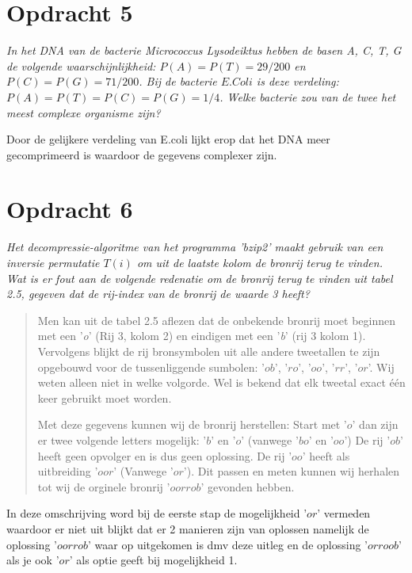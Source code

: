 \section{Opdracht 5}
\emph{In het DNA van de bacterie \emph{Micrococcus Lysodeiktus} hebben de basen \emph{A, C, T, G} de volgende waarschijnlijkheid: $P(A)=P(T)=29/200$ en $P(C)=P(G)=71/200$. Bij de bacterie $E. Coli$ is deze verdeling: $P(A)=P(T)=P(C)=P(G)=1/4$. Welke bacterie zou van de twee het meest complexe organisme zijn?}

Door de gelĳkere verdeling van E.coli lĳkt erop dat het DNA meer gecomprimeerd is waardoor de gegevens complexer zĳn.

\section{Opdracht 6}
\emph{Het decompressie-algoritme van het programma '\emph{bzip2}' maakt gebruik van een inversie permutatie $T(i)$ om uit de laatste kolom de bronrij terug te vinden. Wat is er fout aan de volgende redenatie om de bronrij terug te vinden uit tabel 2.5, gegeven dat de rij-index van de bronrij de waarde 3 heeft?}

\begin{quote}
Men kan uit de tabel 2.5 aflezen dat de onbekende bronrij moet beginnen met een '\emph{o}' (Rij 3, kolom 2) en eindigen met een '\emph{b}' (rij 3 kolom 1). Vervolgens blijkt de rij bronsymbolen uit alle andere tweetallen te zijn opgebouwd voor de tussenliggende sumbolen: '$ob$', '$ro$', '$oo$', '$rr$', '$or$'. Wij weten alleen niet in welke volgorde. Wel is bekend dat elk tweetal exact \'{e}\'{e}n keer gebruikt moet worden.

Met deze gegevens kunnen wij de bronrij herstellen: Start met '$o$' dan zijn er twee volgende letters mogelijk: '$b$' en '$o$' (vanwege '$bo$' en '$oo$') De rij '$ob$' heeft geen opvolger en is dus geen oplossing. De rij '$oo$' heeft als uitbreiding '$oor$' (Vanwege '$or$'). Dit passen en meten kunnen wij herhalen tot wij de orginele bronrij '$oorrob$' gevonden hebben.
\end{quote}

In deze omschrijving word bij de eerste stap de mogelijkheid '$or$' vermeden waardoor er niet uit blijkt dat er 2 manieren zijn van oplossen namelijk de oplossing '$oorrob$' waar op uitgekomen is dmv deze uitleg en de oplossing '$orroob$' als je ook '$or$' als optie geeft bij mogelijkheid 1.

